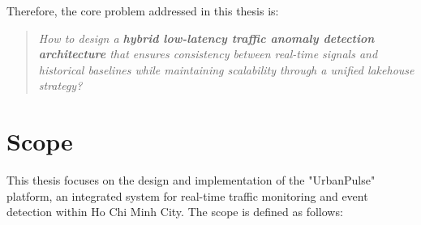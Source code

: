 Therefore, the core problem addressed in this thesis is:
\begin{quote}
\textit{How to design a \textbf{hybrid low-latency traffic anomaly detection architecture} that ensures consistency between real-time signals and historical baselines while maintaining scalability through a unified lakehouse strategy?}
\end{quote}

\section{Scope}

This thesis focuses on the design and implementation of the "UrbanPulse" platform, an integrated system for real-time traffic monitoring and event detection within Ho Chi Minh City. The scope is defined as follows:

